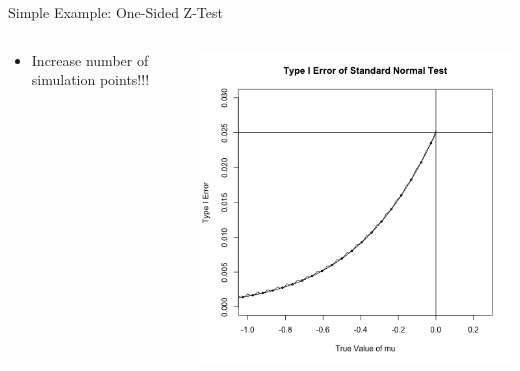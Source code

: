\begin{frame}{Simple Example: One-Sided Z-Test}
\begin{columns}
\begin{column}{.3\textwidth}
\begin{itemize}
\item Increase number of simulation points!!!
\end{itemize}
\end{column}

\begin{column}{.7\textwidth}
\includegraphics[width=\textwidth]{figures/z-test-11.png}
\end{column}
\end{columns}
\end{frame}

